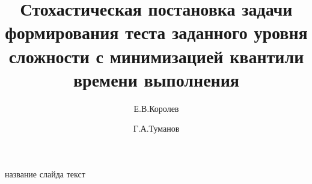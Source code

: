 \documentclass{beamer}
\title[стохастическая задача формирования теста]{Стохастическая постановка задачи формирования теста заданного уровня сложности с минимизацией квантили времени выполнения}
\author[Королев Егор \and Туманов Георгий]{Е.В.Королев \and Г.А.Туманов}
\institute[НИУ МАИ]{Московский авиационный институт (НИУ)}
\begin{document}
    \begin{frame}
        \maketitle
    \end{frame}

    \begin{frame}{название слайда}
        текст\\
    \end{frame}
\end{document}
